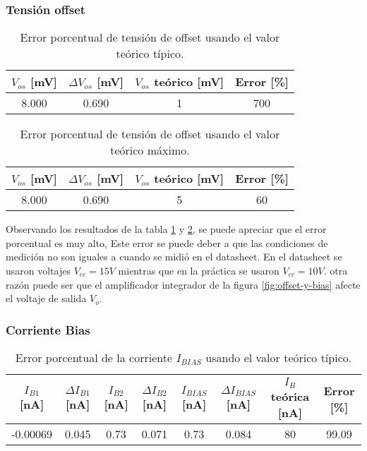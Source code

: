 \subsubsection{Tensión offset}


\begin{table}[h!]
\centering
\begin{tabular}{|c|c|c|c|}
\hline
$V_{os}$ [mV] & $\Delta V_{os}$ [mV] & $V_{os}$ teórico [mV] & Error [\%] \\ \hline
8.000 & 0.690 & 1 & 700 \\ \hline
\end{tabular}
\caption{Error porcentual de tensión de offset usando el valor teórico típico.}
\label{tab:erro-resultados-tension-offset-valor-tipico}
\end{table}

\begin{table}[h!]
\centering
\begin{tabular}{|c|c|c|c|}
\hline
$V_{os}$ [mV] & $\Delta V_{os}$ [mV] & $V_{os}$ teórico [mV] & Error [\%] \\ \hline
8.000 & 0.690 & 5 & 60 \\ \hline
\end{tabular}
\caption{Error porcentual de tensión de offset usando el valor teórico máximo.}
\label{tab:erro-resultados-tension-offset-valor-extremo}
\end{table}


Observando los resultados de la tabla \ref{tab:erro-resultados-tension-offset-valor-tipico} y \ref{tab:erro-resultados-tension-offset-valor-extremo}, se puede apreciar que el error porcentual es muy alto, Este error se puede deber a que las condiciones de medición no son iguales a cuando se midió en el datasheet. En el datasheet se usaron voltajes $V_{cc}=15V$ mientras que en la práctica se usaron $V_{cc}=10V$. otra razón puede ser que el amplificador integrador de la figura \ref{fig:offset-y-bias} afecte el voltaje de salida $V_o$.

\subsubsection{Corriente Bias}

\begin{table}[h!]
\centering
\begin{tabular}{|c|c|c|c|c|c|c|c|}
\hline
$I_{B1}$ [nA] & $\Delta I_{B1}$ [nA] & $I_{B2}$ [nA] & $\Delta I_{B2}$ [nA] & $I_{BIAS}$ [nA] & $\Delta I_{BIAS}$ [nA] & $I_B$ teórica [nA] & Error [\%] \\ \hline
-0.00069 & 0.045 & 0.73 & 0.071 & 0.73 & 0.084 & 80 & 99.09 \\ \hline
\end{tabular}
\caption{Error porcentual de la corriente $I_{BIAS}$ usando el valor teórico típico.}
\label{tab:erro-resultados-corrientes-bias-valor-tipico}
\end{table}

